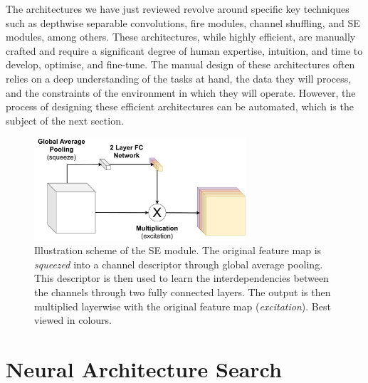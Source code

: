 
The architectures we have just reviewed revolve around specific key techniques
such as depthwise separable convolutions, fire modules, channel shuffling, and
\ac{SE} modules, among others. These architectures, while highly efficient, are
manually crafted and require a significant degree of human expertise, intuition,
and time to develop, optimise, and fine-tune. The manual design of these
architectures often relies on a deep understanding of the tasks at hand, the
data they will process, and the constraints of the environment in which they
will operate. However, the process of designing these efficient architectures
can be automated, which is the subject of the next section.\\


\begin{figure}[htbp]
    \centering
    \includegraphics[width=0.70\textwidth]{chapter_sota/assets/SE_module.pdf}
    \caption{Illustration scheme of the \acf{SE} module. The original feature
    map is \emph{squeezed} into a channel descriptor through global average
    pooling. This descriptor is then used to learn the interdependencies between
    the channels through two fully connected layers. The output is then
    multiplied layerwise with the original feature map (\emph{excitation}). Best
    viewed in colours.}
    \label{fig:sota:se_module}
\end{figure}


\section{Neural Architecture Search}\label{sec:sota:nas} 

